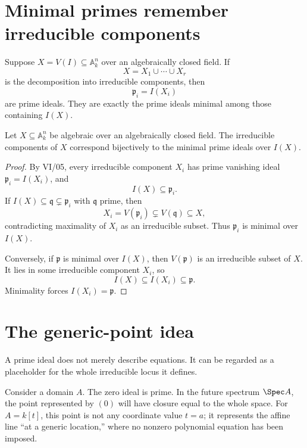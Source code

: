 \section{Minimal primes remember irreducible components}

Suppose \(X=V(I)\subseteq\mathbb A_k^n\) over an algebraically closed field.  If
\[
X=X_1\cup\cdots\cup X_r
\]
is the decomposition into irreducible components, then
\[
\mathfrak p_i=I(X_i)
\]
are prime ideals.  They are exactly the prime ideals minimal among those containing
\(I(X)\).

\begin{theorem}
\label{thm:vi06-components-minimal-primes}
Let \(X\subseteq\mathbb A_k^n\) be algebraic over an algebraically closed field.  The
irreducible components of \(X\) correspond bijectively to the minimal prime ideals over
\(I(X)\).
\end{theorem}

\begin{proof}
By VI/05, every irreducible component \(X_i\) has prime vanishing ideal
\(\mathfrak p_i=I(X_i)\), and
\[
I(X)\subseteq\mathfrak p_i.
\]
If \(I(X)\subseteq\mathfrak q\subsetneq\mathfrak p_i\) with \(\mathfrak q\) prime, then
\[
X_i=V(\mathfrak p_i)\subsetneq V(\mathfrak q)\subseteq X,
\]
contradicting maximality of \(X_i\) as an irreducible subset.  Thus \(\mathfrak p_i\) is
minimal over \(I(X)\).

Conversely, if \(\mathfrak p\) is minimal over \(I(X)\), then \(V(\mathfrak p)\) is an
irreducible subset of \(X\).  It lies in some irreducible component \(X_i\), so
\[
I(X)\subseteq I(X_i)\subseteq\mathfrak p.
\]
Minimality forces \(I(X_i)=\mathfrak p\).
\end{proof}



\section{The generic-point idea}

A prime ideal does not merely describe equations.  It can be regarded as a placeholder for
the whole irreducible locus it defines.

Consider a domain \(A\).  The zero ideal is prime.  In the future spectrum
\(\Spec A\), the point represented by \((0)\) will have closure equal to the whole space.
For \(A=k[t]\), this point is not any coordinate value \(t=a\); it represents the affine
line ``at a generic location,'' where no nonzero polynomial equation has been imposed.

